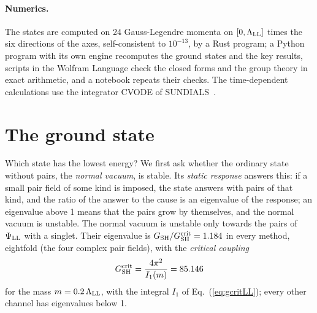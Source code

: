 \documentclass[aps,prd,twocolumn,superscriptaddress,nofootinbib,floatfix,longbibliography]{revtex4-2}
\newcommand{\LL}{{\rm LL}}
\newcommand{\SH}{{\rm SH}}
\begin{document}
\paragraph*{Numerics.} The states are computed on 24 Gauss-Legendre momenta on $[0,\Lambda_\LL]$ times the six
directions of the axes, self-consistent to $10^{-13}$, by a Rust program; a Python program with its own engine recomputes
the ground states and the key results, scripts in the Wolfram Language check the closed forms and the group theory in
exact arithmetic, and a notebook repeats their checks. The time-dependent calculations use the integrator CVODE
of SUNDIALS~\cite{SUNDIALS2005,SUNDIALS2022}.

\section{The ground state}
\label{sec:ground}

Which state has the lowest energy? We first ask whether the ordinary state without pairs, the \emph{normal vacuum}, is
stable. Its \emph{static response} answers this: if a small pair field of some kind is imposed, the state answers with
pairs of that kind, and the ratio of the answer to the cause is an eigenvalue of the response; an eigenvalue above 1
means that the pairs grow by themselves, and the normal vacuum is unstable. The normal vacuum is unstable only towards
the pairs of $\Psi_\LL$ with a singlet. Their eigenvalue is $G_\SH/G^{\rm crit}_\SH=1.184$ in every method, eightfold
(the four complex pair fields), with the \emph{critical coupling}
\begin{equation}
G^{\rm crit}_\SH=\frac{4\pi^2}{I_1(m)}=85.146
\label{eq:Gcrit}
\end{equation}
for the mass $m=0.2\,\Lambda_\LL$, with the integral $I_1$ of Eq.~(\ref{eq:gcritLL}); every other channel has
eigenvalues below 1.
\end{document}
